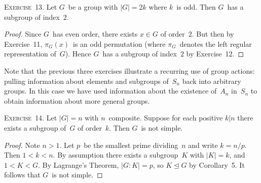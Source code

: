\documentclass[letterpaper]{article}
\newcommand{\exercise}[1]{\goodbreak\noindent\textsc{Exercise~{#1}.}}
\newcommand{\normal}{\trianglelefteq}
\newcommand{\ord}[1]{|{#1}|}
\newcommand{\gindex}[2]{|{#1}:{#2}|}
\begin{document}
\exercise{13}
Let $G$~be a group with $\ord{G}=2k$ where $k$~is odd. Then $G$~has a subgroup of index~$2$.
\begin{proof}
Since $G$~has even order, there exists $x\in G$ of order~$2$. But then by Exercise~11, $\pi_G(x)$~is an odd permutation (where $\pi_G$~denotes the left regular representation of~$G$). Hence $G$~has a subgroup of index~$2$ by Exercise~12.
\end{proof}
\noindent Note that the previous three exercises illustrate a recurring use of group actions: pulling information about elements and subgroups of~$S_n$ back into arbitrary groups. In this case we have used information about the existence of~$A_n$ in~$S_n$ to obtain information about more general groups.

\bigskip
\exercise{14}
Let $\ord{G}=n$ with $n$~composite. Suppose for each positive $k|n$ there exists a subgroup of~$G$ of order~$k$. Then $G$~is not simple.
\begin{proof}
Note $n>1$. Let $p$~be the smallest prime dividing~$n$ and write $k=n/p$. Then $1<k<n$. By assumption there exists a subgroup~$K$ with $\ord{K}=k$, and $1<K<G$. By Lagrange's Theorem, $\gindex{G}{K}=p$, so $K\normal G$ by Corollary~5. It follows that $G$~is not simple.
\end{proof}
\end{document}
